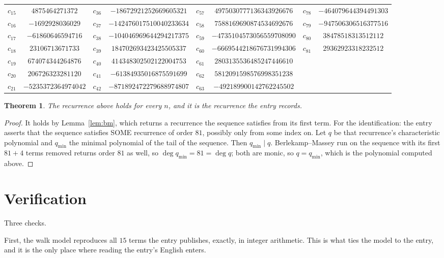 \documentclass[11pt,a4paper]{article}
\theoremstyle{plain}
\newtheorem{theorem}{Theorem}
\theoremstyle{definition}
\begin{document}
\begin{center}
\begin{tabular}{cccccccc}
$c_{15}$ & $4875464271372$ & $c_{36}$ & $-18672921252669605321$ & $c_{57}$ & $4975030777136343926676$ & $c_{78}$ & $-464079644394491303$ \\
$c_{16}$ & $-1692928036029$ & $c_{37}$ & $-142476017510040233634$ & $c_{58}$ & $7588169690874534692676$ & $c_{79}$ & $-947506306516377516$ \\
$c_{17}$ & $-61860646594716$ & $c_{38}$ & $-104046969644294217375$ & $c_{59}$ & $-4735104573056559708090$ & $c_{80}$ & $38478518313512112$ \\
$c_{18}$ & $23106713671733$ & $c_{39}$ & $184702693423425505337$ & $c_{60}$ & $-6669544218676731994306$ & $c_{81}$ & $29362923318232512$ \\
$c_{19}$ & $674074344264876$ & $c_{40}$ & $414348302502122004753$ & $c_{61}$ & $2803135536485247446610$ &  &  \\
$c_{20}$ & $206726323281120$ & $c_{41}$ & $-61384935016875591699$ & $c_{62}$ & $5812091598576998351238$ &  &  \\
$c_{21}$ & $-5235372364974042$ & $c_{42}$ & $-871892472279688974807$ & $c_{63}$ & $-492189900142762245502$ &  &  \\
\end{tabular}
\end{center}

\begin{theorem}
The recurrence above holds for every $n$, and it is the recurrence the entry records.
\end{theorem}

\begin{proof}
It holds by Lemma~\ref{lem:bm}, which returns a recurrence the sequence satisfies from its
first term. For the identification: the entry asserts that the sequence satisfies SOME
recurrence of order $81$, possibly only from some index on. Let $q$ be that recurrence's
characteristic polynomial and $q_{\min}$ the minimal polynomial of the tail of the sequence.
Then $q_{\min}\mid q$. Berlekamp--Massey run on the sequence with its first $81+4$ terms
removed returns order $81$ as well, so $\deg q_{\min}=81=\deg q$; both are monic, so
$q=q_{\min}$, which is the polynomial computed above.
\end{proof}

\section{Verification}

Three checks.

First, the walk model reproduces all $15$ terms the entry publishes, exactly, in integer
arithmetic. This is what ties the model to the entry, and it is the only place where reading
the entry's English enters.
\end{document}
